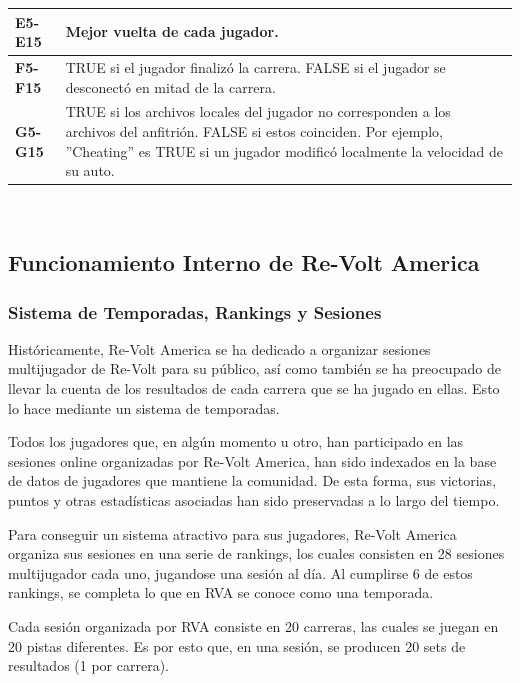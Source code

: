 \begin{center}
\begin{tabular}{ | l | p{13cm} |}
		{\textbf{E5-E15}} & Mejor vuelta de cada jugador.\\ \hline
		
		{\textbf{F5-F15}} & TRUE si el jugador finalizó la carrera. FALSE si el jugador se desconectó en mitad de la carrera.\\ \hline
		
		{\textbf{G5-G15}} & TRUE si los archivos locales del jugador no corresponden a los archivos del anfitrión. FALSE si estos coinciden. Por ejemplo, ''Cheating'' es TRUE si un jugador modificó localmente la velocidad de su auto.\\ \hline
	\end{tabular}
    \\
\label{table:sessionlog}
\end{center}

\subsection{Funcionamiento Interno de Re-Volt America}

\subsubsection{Sistema de Temporadas, Rankings y Sesiones}
Históricamente, Re-Volt America se ha dedicado a organizar sesiones multijugador de Re-Volt para su público, así como también se ha preocupado de llevar la cuenta de los resultados de cada carrera que se ha jugado en ellas. Esto lo hace mediante un sistema de temporadas.

Todos los jugadores que, en algún momento u otro, han participado en las sesiones online organizadas por Re-Volt America, han sido indexados en la base de datos de jugadores que mantiene la comunidad. De esta forma, sus victorias, puntos y otras estadísticas asociadas han sido preservadas a lo largo del tiempo.

Para conseguir un sistema atractivo para sus jugadores, Re-Volt America organiza sus sesiones en una serie de rankings, los cuales consisten en 28 sesiones multijugador cada uno, jugandose una sesión al día. Al cumplirse 6 de estos rankings, se completa lo que en RVA se conoce como una temporada.

Cada sesión organizada por RVA consiste en 20 carreras, las cuales se juegan en 20 pistas diferentes. Es por esto que, en una sesión, se producen 20 sets de resultados (1 por carrera).

